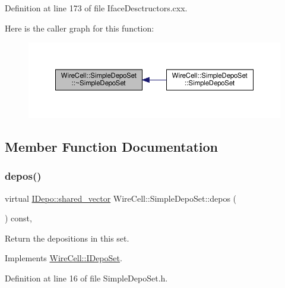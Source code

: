 Definition at line 173 of file Iface\+Desctructors.\+cxx.

Here is the caller graph for this function\+:
\nopagebreak
\begin{figure}[H]
\begin{center}
\leavevmode
\includegraphics[width=350pt]{class_wire_cell_1_1_simple_depo_set_ac005a5edae9e6e2da09983f4c798db78_icgraph}
\end{center}
\end{figure}


\subsection{Member Function Documentation}
\mbox{\label{class_wire_cell_1_1_simple_depo_set_ad52d0c0bbec9c993efbba14c1aaed564}} 
\subsubsection{\texorpdfstring{depos()}{depos()}}
{\footnotesize\ttfamily virtual \hyperlink{class_wire_cell_1_1_i_data_a6edac35e7dd886018740993b28c7ca1e}{I\+Depo\+::shared\+\_\+vector} Wire\+Cell\+::\+Simple\+Depo\+Set\+::depos (\begin{DoxyParamCaption}{ }\end{DoxyParamCaption}) const\hspace{0.3cm}{\ttfamily [inline]}, {\ttfamily [virtual]}}



Return the depositions in this set. 



Implements \hyperlink{class_wire_cell_1_1_i_depo_set_abbaa8ccebefb3034e8c725d8fe069508}{Wire\+Cell\+::\+I\+Depo\+Set}.



Definition at line 16 of file Simple\+Depo\+Set.\+h.

